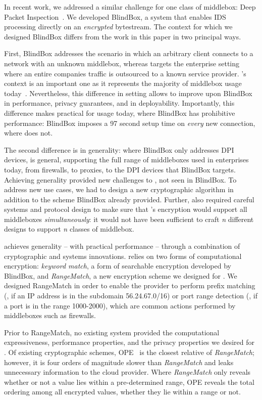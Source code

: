 In recent work, we addressed a similar challenge for one class of middlebox: Deep Packet Inspection~\cite{blindbox}.  
We developed BlindBox, a system that enables IDS processing directly on an \emph{encrypted} bytestream. 
The context for which we designed BlindBox differs from the work in this paper in two principal ways.

First, BlindBox addresses the scenario in which an arbitrary client connects to a network with an unknown middlebox, whereas \sys targets the enterprise setting where an entire companies traffic is outsourced to a known service provider.
\sys's context is an important one as it represents the majority of middlebox usage today~\cite{need-citation}. 
Nevertheless, this difference in setting allows \sys to improve upon BlindBox in performance, privacy guarantees, and in deployability. 
Importantly, this difference makes \sys practical for usage today, where BlindBox has prohibitive performance: BlindBox imposes a 97 second setup time on {\it every} new connection, where \sys does not.

The second difference is in generality: where BlindBox only addresses DPI devices, \sys is general, supporting the full range of middleboxes used in enterprises today, from firewalls, to proxies, to the DPI devices that BlindBox targets.
Achieving generality provided new challenges to \sys, not seen in BlindBox. 
To address new use cases, we had to design a new cryptographic algorithm in addition to the scheme BlindBox already provided. 
Further, \sys also required careful systems and protocol design to make sure that \sys's encryption would support all middleboxes {\it simultaneously}: it would not have been sufficient to craft {\it n} different designs to support {\it n} classes of middlebox.


    \sys achieves generality -- with practical performance -- through a combination of cryptographic and systems innovations.
    \sys relies on two forms of computational encryption: {\it keyword match}, a form of searchable encryption developed by BlindBox,  and {\it RangeMatch}, a new encryption scheme we designed for \sys.
    We designed RangeMatch in order to enable the provider to perform prefix matching (\eg{}, if an IP address is in the subdomain 56.24.67.0/16) or port range detection (\eg{}, if a port is in the range 1000-2000), which are common actions performed by middleboxes such as firewalls. 

    Prior to RangeMatch, no existing system provided the computational expressiveness, performance properties, and the privacy properties we desired for \sys.
    Of existing cryptographic schemes, OPE~\cite{cryptdb} is the closest relative of {\it RangeMatch}; however, it is four orders of magnitude slower than {\it RangeMatch} and leaks unnecessary information to the cloud provider.
    Where {\em RangeMatch} only reveals whether or not a value lies within a pre-determined range, OPE reveals the total ordering among all encrypted values, whether they lie within a range or not.

